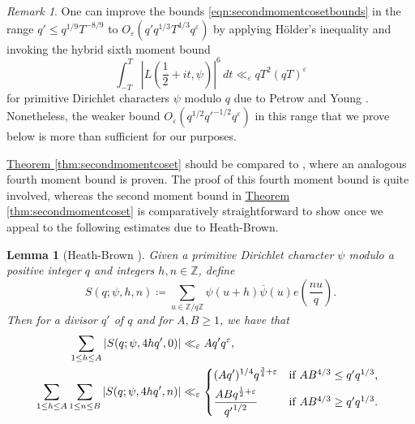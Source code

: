 \documentclass[11pt,a4paper]{amsart}
\newcommand{\e}{\varepsilon}
\newcommand{\Z}{\mathbb{Z}}
\numberwithin{equation}{section}
\newtheorem{lemma}[equation]{Lemma}
\theoremstyle{remark}
\newtheorem{remark}[equation]{Remark}
\theoremstyle{definition}
\begin{document}
\begin{remark}
One can improve the bounds \eqref{eqn:secondmomentcosetbounds} in the range $q' \leq q^{1/9} T^{-8/9}$ to $O_{\e}(q' q^{1/3} T^{4/3} q^{\e})$ by applying H\"{o}lder's inequality and invoking the hybrid sixth moment bound
\[\int_{-T}^{T} \left|L\left(\frac{1}{2} + it,\psi\right)\right|^6 \, dt \ll_{\e} qT^2 (qT)^{\e}\]
for primitive Dirichlet characters $\psi$ modulo $q$ due to Petrow and Young \cite[Theorems 1.2 and 1.3]{PY23}. Nonetheless, the weaker bound $O_{\e}(q^{1/2} {q'}^{-1/2} q^{\e})$ in this range that we prove below is more than sufficient for our purposes.
\end{remark}

\hyperref[thm:secondmomentcoset]{Theorem \ref*{thm:secondmomentcoset}} should be compared to \cite[Theorem 1.4]{PY23}, where an analogous fourth moment bound is proven. The proof of this fourth moment bound is quite involved, whereas the second moment bound in \hyperref[thm:secondmomentcoset]{Theorem \ref*{thm:secondmomentcoset}} is comparatively straightforward to show once we appeal to the following estimates due to Heath-Brown.

\begin{lemma}[Heath-Brown {\cite[Lemma 9]{H-B78}}]
Given a primitive Dirichlet character $\psi$ modulo a positive integer $q$ and integers $h,n \in \Z$, define
\begin{equation}
\label{eqn:HBsumdefeq}
S(q;\psi,h,n) \coloneqq \sum_{u \in \Z/q\Z} \psi(u + h) \overline{\psi}(u) e\left(\frac{nu}{q}\right).
\end{equation}
Then for a divisor $q'$ of $q$ and for $A,B \geq 1$, we have that
\begin{align}
\label{eqn:HBbounds1}
\sum_{1\leq h\leq A} |S(q;\psi,4hq',0)| & \ll_{\e} A q' q^{\e},	\\
\label{eqn:HBbounds2}
\sum_{1\leq h\leq A} \sum_{1\leq n\leq B} |S(q;\psi,4hq',n)| & \ll_{\e}
\begin{dcases*}
(Aq')^{1/4} q^{\frac{3}{4} + \e} & if $A B^{4/3} \leq q' q^{1/3}$,	\\
\frac{AB q^{\frac{1}{2} + \e}}{{q'}^{1/2}} & if $A B^{4/3} \geq q' q^{1/3}$.
\end{dcases*}
\end{align}
\end{lemma}
\end{document}
